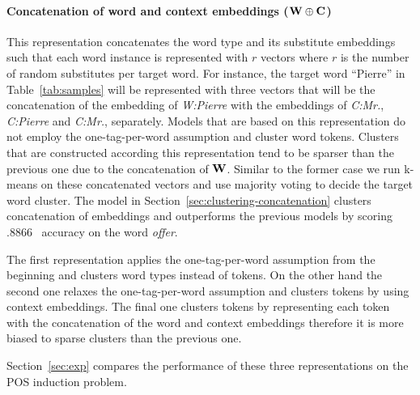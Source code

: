 \paragraph{Concatenation of word and context embeddings (${\bf W\oplus
    C}$)}
This representation concatenates the word type and its substitute
embeddings such that each word instance is represented with $r$
vectors where $r$ is the number of random substitutes per target word.
For instance, the target word ``Pierre'' in Table~\ref{tab:samples}
will be represented with three vectors that will be the concatenation
of the embedding of {\it W:Pierre} with the embeddings of {\it C:Mr.},
{\it C:Pierre} and {\it C:Mr.}, separately.  Models that are based on
this representation do not employ the one-tag-per-word assumption and
cluster word tokens.  Clusters that are constructed according this
representation tend to be sparser than the previous one due to the
concatenation of ${\bf W}$.  Similar to the former case we run k-means
on these concatenated vectors and use majority voting to decide the
target word cluster.  The model in
Section~\ref{sec:clustering-concatenation} clusters concatenation of
embeddings and outperforms the previous models by scoring .8866 \mto\
accuracy on the word {\em offer}.

The first representation applies the one-tag-per-word assumption from
the beginning and clusters word types instead of tokens.  On the other
hand the second one relaxes the one-tag-per-word assumption and
clusters tokens by using context embeddings.  The final one clusters
tokens by representing each token with the concatenation of the word
and context embeddings therefore it is more biased to sparse clusters
than the previous one.

Section~\ref{sec:exp} compares the performance of these three
representations on the POS induction problem.
